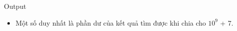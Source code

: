 Output
\begin{itemize}
	\item     Một số duy nhất là phần dư của kết quả tìm được khi chia cho $10^{9}$    + 7.   
\end{itemize}
